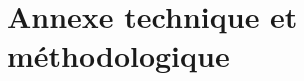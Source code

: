\documentclass[a5paper,french,openany]{memoir}
\begin{document}



\appendix

\part*{Annexe technique et méthodologique}\label{annexe}
\end{document}
